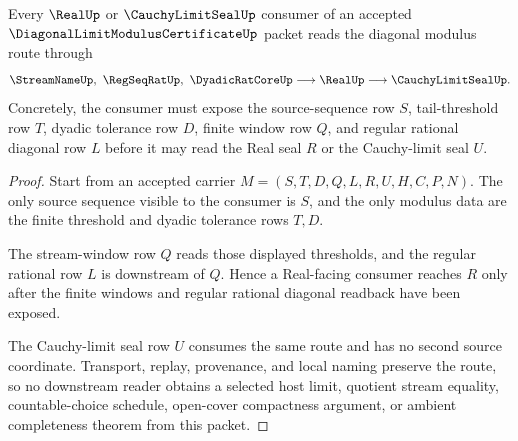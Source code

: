 \begin{theorem}
\label{thm:diagonal-limit-modulus-certificate-seal-route}
Every $\RealUp$ or $\CauchyLimitSealUp$ consumer of an accepted $\DiagonalLimitModulusCertificateUp$ packet reads the diagonal modulus route through
$$
\StreamNameUp,\ \RegSeqRatUp,\ \DyadicRatCoreUp \longrightarrow \RealUp \longrightarrow \CauchyLimitSealUp .
$$
Concretely, the consumer must expose the source-sequence row $S$, tail-threshold row $T$, dyadic tolerance row $D$, finite window row $Q$, and regular rational diagonal row $L$ before it may read the Real seal $R$ or the Cauchy-limit seal $U$.
\end{theorem}
\begin{proof}
Start from an accepted carrier $M=(S,T,D,Q,L,R,U,H,C,P,N)$. The only source sequence visible to the consumer is $S$, and the only modulus data are the finite threshold and dyadic tolerance rows $T,D$.

The stream-window row $Q$ reads those displayed thresholds, and the regular rational row $L$ is downstream of $Q$. Hence a Real-facing consumer reaches $R$ only after the finite windows and regular rational diagonal readback have been exposed.

The Cauchy-limit seal row $U$ consumes the same route and has no second source coordinate. Transport, replay, provenance, and local naming preserve the route, so no downstream reader obtains a selected host limit, quotient stream equality, countable-choice schedule, open-cover compactness argument, or ambient completeness theorem from this packet.
\end{proof}



